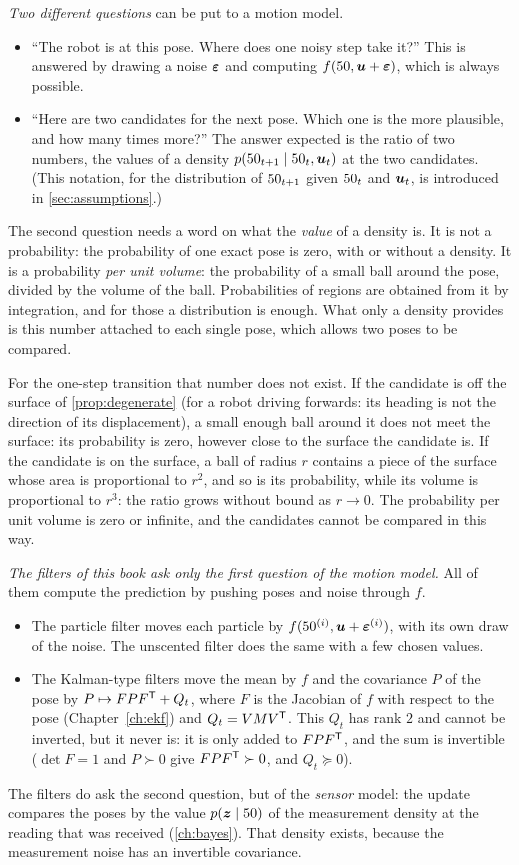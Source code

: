 \emph{Two different questions} can be put to a motion model.
\begin{itemize}[nosep]
  \item ``The robot is at this pose. Where does one noisy step take it?''
    This is answered by drawing a noise $\bm{\varepsilon}$ and computing
    $f(50,\bm{u}+\bm{\varepsilon})$, which is always possible.
  \item ``Here are two candidates for the next pose. Which one is the
    more plausible, and how many times more?'' The answer expected is the
    ratio of two numbers, the values of a density
    $p(50_{t+1}\mid50_t,\bm{u}_t)$ at the two candidates. (This notation,
    for the distribution of $50_{t+1}$ given $50_t$ and $\bm{u}_t$, is
    introduced in \cref{sec:assumptions}.)
\end{itemize}
The second question needs a word on what the \emph{value} of a density
is. It is not a probability: the probability of one exact pose is zero,
with or without a density. It is a probability \emph{per unit volume}: the
probability of a small ball around the pose, divided by the volume of the
ball. Probabilities of regions are obtained from it by integration, and
for those a distribution is enough. What only a density provides is this
number attached to each single pose, which allows two poses to be
compared.

For the one-step transition that number does not exist. If the candidate
is off the surface of \cref{prop:degenerate} (for a robot driving
forwards: its heading is not the direction of its displacement), a small
enough ball around it does not
meet the surface: its probability is zero, however close to the surface
the candidate is. If the candidate is on the surface, a ball of radius $r$
contains a piece of the surface whose area is proportional to $r^2$, and
so is its probability, while its volume is proportional to $r^3$: the
ratio grows without bound as $r\to0$. The probability per unit volume is zero or infinite, and
the candidates cannot be compared in this way.

\emph{The filters of this book ask only the first question of the motion
model.} All of them compute the prediction by pushing poses and noise
through $f$.
\begin{itemize}[nosep]
  \item The particle filter moves each particle by
    $f(50^{(i)},\bm{u}+\bm{\varepsilon}^{(i)})$, with its own draw of the noise. The
    unscented filter does the same with a few chosen values.
  \item The Kalman-type filters move the mean by $f$ and the covariance
    $P$ of the pose by $P\mapsto FPF^{\mathsf{T}}+Q_t$, where $F$ is the Jacobian of
    $f$ with respect to the pose (Chapter~\ref{ch:ekf}) and
    $Q_t=VMV^{\mathsf{T}}$. This $Q_t$ has rank $2$ and
    cannot be inverted, but it never is: it is only added to $FPF^{\mathsf{T}}$, and
    the sum is invertible ($\det F=1$ and $P\succ0$ give $FPF^{\mathsf{T}}\succ0$,
    and $Q_t\succeq0$).
\end{itemize}
The filters do ask the second question, but of the \emph{sensor} model:
the update compares the poses by the value $p(\bm{z}\mid50)$ of the
measurement density at the reading that was received
(\cref{ch:bayes}). That density exists, because the measurement
noise has an invertible covariance.

